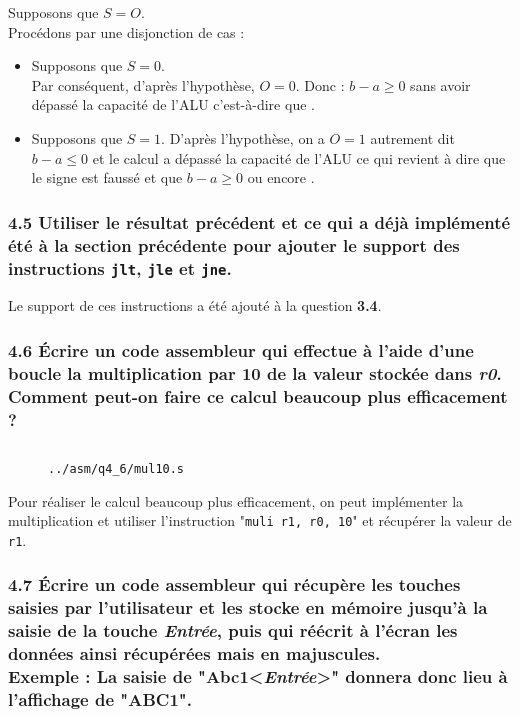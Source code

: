 \documentclass[twoside, 12pt, a4paper]{article}
\newcommand{\fm}[2]{
\begin{figure}[!h]
    \centering
    \inputminted[]{asm}{#1}
    \caption{\texttt{#2}}
\end{figure}
}
\begin{document}
        \framebox[1cm][c]{$\impliedby$} Supposons que $S = O$. \\
        Procédons par une disjonction de cas :
        \begin{itemize}
            \item Supposons que $S = 0$. \\
            Par conséquent, d'après l'hypothèse, $O = 0$.
            Donc : $b-a \geq 0$ sans avoir dépassé la capacité de l'ALU c'est-à-dire que .
            \item Supposons que $S = 1$.
            D'après l'hypothèse, on a $O = 1$ autrement dit $b-a \leq 0$ et le calcul a dépassé la capacité de l'ALU ce qui revient à dire que le signe est faussé et que $b-a \geq 0$ ou encore .
        \end{itemize}
                
        \subsubsection*{\textbf{4.5} Utiliser le résultat précédent et ce qui a déjà implémenté été à la section précédente pour ajouter le support des instructions \texttt{jlt}, \texttt{jle} et \texttt{jne}.}

Le support de ces instructions a été ajouté à la question \textbf{3.4}.
        
        \subsubsection*{\textbf{4.6} Écrire un code assembleur qui effectue à l'aide d'une boucle la multiplication par 10 de la valeur stockée dans \textit{r0}.\\
        Comment peut-on faire ce calcul beaucoup plus efficacement ?}


\fm{../asm/q4_6/mul10.s}{../asm/q4\_6/mul10.s}

Pour réaliser le calcul beaucoup plus efficacement, on peut implémenter la multiplication et utiliser l'instruction "\texttt{muli r1, r0, 10}" et récupérer la valeur de \texttt{r1}.

\clearpage
        
        \subsubsection*{\textbf{4.7} Écrire un code assembleur qui récupère les touches saisies par l'utilisateur et les stocke en mémoire jusqu'à la saisie de la touche \textit{Entrée}, puis qui réécrit à l'écran les données ainsi récupérées mais en majuscules.\\
        \textbf{Exemple : } La saisie de "Abc1<\textit{Entrée}>" donnera donc lieu à l'affichage de "ABC1".}
\end{document}
